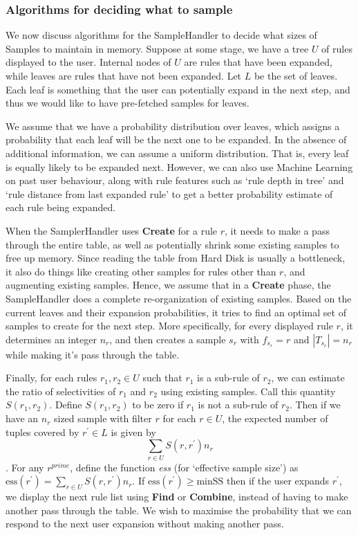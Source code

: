 \documentclass{sig-alternate}
\newcounter{prob}
\begin{document}
\subsubsection{Algorithms for deciding what to sample}\label{sec:sampling_algorithms}
We now discuss algorithms for the SampleHandler to decide what sizes of Samples to maintain in memory. Suppose at some stage, we have a tree $U$ of rules displayed to the user. Internal nodes of $U$ are rules that have been expanded, while leaves are rules that have not been expanded. Let $L$ be the set of leaves. Each leaf is something that the user can potentially expand in the next step, and thus we would like to have pre-fetched samples for leaves. 

We assume that we have a probability distribution over leaves, which assigns a probability that each leaf will be the next one to be expanded. In the absence of additional information, we can assume a uniform distribution. That is, every leaf is equally likely to be expanded next. However, we can also use Machine Learning on past user behaviour, along with rule features such as `rule depth in tree' and `rule distance from last expanded rule' to get a better probability estimate of each rule being expanded. 

When the SamplerHandler uses \textbf{Create} for a rule $r$, it needs to make a pass through the entire table, as well as potentially shrink some existing samples to free up memory. Since reading the table from Hard Disk is usually a bottleneck, it also do things like creating other samples for rules other than $r$, and augmenting existing samples. Hence, we assume that in a \textbf{Create} phase, the SampleHandler does a complete re-organization of existing samples. Based on the current leaves and their expansion probabilities, it tries to find an optimal set of samples to create for the next step. More specifically, for every displayed rule $r$, it determines an integer $n_r$, and then creates a sample $s_r$ with $f_{s_r} = r$ and $|T_{s_r}| = n_r$ while making it's pass through the table. 

Finally, for each rules $r_1, r_2 \in U$ such that $r_1$ is a sub-rule of $r_2$, we can estimate the ratio of selectivities of $r_1$ and $r_2$ using existing samples. Call this quantity $S(r_1, r_2)$. Define $S(r_1, r_2)$ to be zero if $r_1$ is not a sub-rule of $r_2$. Then if we have an $n_r$ sized sample with filter $r$ for each $r \in U$, the expected number of tuples covered by $r^{\prime} \in L$ is given by $$\sum_{r \in U} S(r, r^{\prime})n_r$$. For any $r^{prime}$, define the function {\em ess} (for `effective sample size') as $\text{ess}(r^{\prime}) = \sum_{r \in U} S(r, r^{\prime})n_r$. If $\text{ess}(r^{\prime}) \geq \text{minSS}$ then if the user expands $r^{\prime}$, we display the next rule list using \textbf{Find} or \textbf{Combine}, instead of having to make another pass through the table. We wish to maximise the probability that we can respond to the next user expansion without making another pass. 
\end{document}
